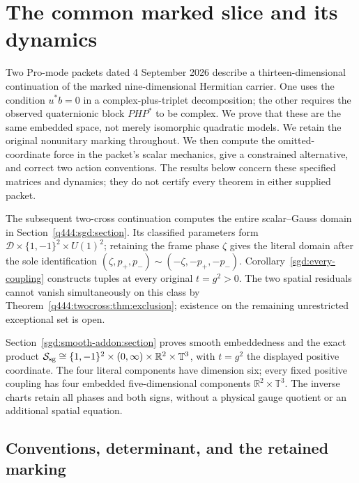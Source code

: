 \section{The common marked slice and its dynamics}
\label{sec:q444-reconciliation}

Two Pro-mode packets dated 4 September 2026 describe a thirteen-dimensional
continuation of the marked nine-dimensional Hermitian carrier. One uses
the condition $u^*b=0$ in a complex-plus-triplet decomposition; the other
requires the observed quaternionic block $PHP^*$ to be complex. We prove
that these are the same embedded space, not merely isomorphic quadratic
models. We retain the original nonunitary marking throughout. We then
compute the omitted-coordinate force in the packet's scalar mechanics,
give a constrained alternative, and correct two action conventions.
The results below concern these specified matrices and dynamics; they do
not certify every theorem in either supplied packet.

The subsequent two-cross continuation computes the entire scalar--Gauss
domain in Section~\ref{q444:sgd:section}. Its classified parameters form
$\mathcal D\times\{1,-1\}^2\times U(1)^2$; retaining the frame phase
$\zeta$ gives the literal domain after the sole identification
$(\zeta,p_+,p_-)\sim(-\zeta,-p_+,-p_-)$.
Corollary~\ref{sgd:every-coupling} constructs tuples at every original
$t=g^2>0$. The two spatial residuals cannot vanish simultaneously on this class by
Theorem~\ref{q444:twocross:thm:exclusion}; existence on the remaining
unrestricted exceptional set is open.

Section~\ref{sgd:smooth-addon:section} proves smooth embeddedness and
the exact product
$\mathcal S_{\rm sg}\cong\{1,-1\}^2\times(0,\infty)
\times\mathbb R^2\times\mathbb T^3$, with $t=g^2$ the displayed
positive coordinate. The four literal components have dimension six;
every fixed positive coupling has four embedded five-dimensional
components $\mathbb R^2\times\mathbb T^3$. The inverse charts retain
all phases and both signs, without a physical gauge quotient or an
additional spatial equation.

\subsection{Conventions, determinant, and the retained marking}

